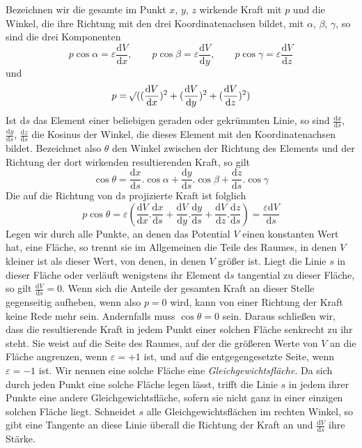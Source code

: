 Bezeichnen wir die gesamte im Punkt $x$, $y$, $z$ wirkende Kraft mit $p$ und die Winkel, die ihre Richtung mit den drei Koordinatenachsen bildet, mit $\alpha$, $\beta$, $\gamma$, so sind die drei Komponenten
\[
p\cos\alpha=\varepsilon\frac{\mathrm{d}V}{\mathrm{d}x},\qquad p\cos\beta=\varepsilon\frac{\mathrm{d}V}{\mathrm{d}y},\qquad p\cos\gamma=\varepsilon\frac{\mathrm{d}V}{\mathrm{d}z}
\]
und
\[
p=\mathord{{}^{}\!\surd}((\frac{\mathrm{d}V}{\mathrm{d}x})^2+(\frac{\mathrm{d}V}{\mathrm{d}y})^2+(\frac{\mathrm{d}V}{\mathrm{d}z})^2)
\]
Ist $\mathrm{d}s$ das Element einer beliebigen geraden oder gekrümmten Linie, so sind $\frac{\mathrm{d}x}{\mathrm{d}s}$, $\frac{\mathrm{d}y}{\mathrm{d}s}$, $\frac{\mathrm{d}z}{\mathrm{d}s}$ die Kosinus der Winkel, die dieses Element mit den Koordinatenachsen bildet. Bezeichnet also $\theta$ den Winkel zwischen der Richtung des Elements und der Richtung der dort wirkenden resultierenden Kraft, so gilt
\[
\cos\theta=\frac{\mathrm{d}x}{\mathrm{d}s}.\cos\alpha+\frac{\mathrm{d}y}{\mathrm{d}s}.\cos\beta+\frac{\mathrm{d}z}{\mathrm{d}s}.\cos\gamma
\]
Die auf die Richtung von $\mathrm{d}s$ projizierte Kraft ist folglich
\[
p\cos\theta=\varepsilon(\frac{\mathrm{d}V}{\mathrm{d}x}.\frac{\mathrm{d}x}{\mathrm{d}s}+\frac{\mathrm{d}V}{\mathrm{d}y}.\frac{\mathrm{d}y}{\mathrm{d}s}+\frac{\mathrm{d}V}{\mathrm{d}z}.\frac{\mathrm{d}z}{\mathrm{d}s})=\frac{\varepsilon\mathrm{d}V}{\mathrm{d}s}
\]
Legen wir durch alle Punkte, an denen das Potential $V$ einen konstanten Wert hat, eine Fläche, so trennt sie im Allgemeinen die Teile des
Raumes, in denen $V$ kleiner ist als dieser Wert, von denen, in denen $V$ größer ist. Liegt die Linie $s$ in dieser Fläche oder verläuft wenigstens ihr Element $\mathrm{d}s$ tangential zu dieser Fläche, so gilt $\frac{\mathrm{d}V}{\mathrm{d}s}=0$. Wenn sich die Anteile der gesamten Kraft an dieser Stelle gegenseitig aufheben, wenn also $p=0$ wird, kann von einer Richtung der Kraft keine Rede mehr sein. Andernfalls muss $\cos\theta=0$ sein. Daraus schließen wir, dass die resultierende Kraft in jedem Punkt einer solchen Fläche senkrecht zu ihr steht. Sie weist auf die Seite des Raumes, auf der die größeren Werte von $V$ an die Fläche angrenzen, wenn $\varepsilon=+1$ ist, und auf die entgegengesetzte Seite, wenn $\varepsilon=-1$ ist. Wir nennen eine solche Fläche eine \textit{Gleichgewichtsfläche}. Da sich durch jeden Punkt eine solche Fläche legen lässt, trifft die Linie $s$ in jedem ihrer Punkte eine andere Gleichgewichtsfläche, sofern sie nicht ganz in einer einzigen solchen Fläche liegt. Schneidet $s$ alle Gleichgewichtsflächen im rechten Winkel, so gibt eine Tangente an diese Linie überall die Richtung der Kraft an und $\frac{\mathrm{d}V}{\mathrm{d}s}$ ihre Stärke.

